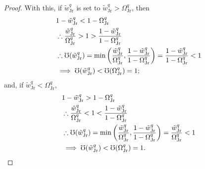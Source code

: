 \documentclass[hidelinks, nonatbib]{elsarticle}
\begin{document}
\begin{lemma}
\begin{proof}
        With this, if $\tilde{w}_{\text{Jr}}^{q}$ is set to $\tilde{w}_{\text{Jr}}^{q} > \Omega_{\text{Jr}}^{q}$, then
        \begin{align}
            &
            1 - \tilde{w}_{\text{Jr}}^{q}
            <
            1 - \Omega_{\text{Jr}}^{q}
            \\
            &\therefore
            \frac{
                \tilde{w}_{\text{Jr}}^{q}
            }{
                \Omega_{\text{Jr}}^{q}
            }
            >
            1
            >
            \frac{
                1 - \tilde{w}_{\text{Jr}}^{q}
            }{
                1 - \Omega_{\text{Jr}}^{q}
            }
            \\
            &\therefore
            \mho(\tilde{w}_{\text{Jr}}^{q}) 
            =
            \min\left(
                \frac{
                    \tilde{w}_{\text{Jr}}^{q}
                }{
                    \Omega_{\text{Jr}}^{q}
                }
                ,
                \frac{
                    1 - \tilde{w}_{\text{Jr}}^{q}
                }{
                    1 - \Omega_{\text{Jr}}^{q}
                }
            \right)
            =
            \frac{
                1 - \tilde{w}_{\text{Jr}}^{q}
            }{
                1 - \Omega_{\text{Jr}}^{q}
            }
            <
            1
            \\
            &\implies
            \mho(\tilde{w}_{\text{Jr}}^{q})
            <
            \mho(\Omega_{\text{Jr}}^{q})
            =
            1
            ;
        \end{align}
        and, if $\tilde{w}_{\text{Jr}}^{q} < \Omega_{\text{Jr}}^{q}$,
        \begin{align}
            &
            1 - \tilde{w}_{\text{Jr}}^{q}
            >
            1 - \Omega_{\text{Jr}}^{q}
            \\
            &\therefore
            \frac{
                \tilde{w}_{\text{Jr}}^{q}
            }{
                \Omega_{\text{Jr}}^{q}
            }
            <
            1
            <
            \frac{
                1 - \tilde{w}_{\text{Jr}}^{q}
            }{
                1 - \Omega_{\text{Jr}}^{q}
            }
            \\
            &\therefore
            \mho(\tilde{w}_{\text{Jr}}^{q}) 
            =
            \min\left(
                \frac{
                    \tilde{w}_{\text{Jr}}^{q}
                }{
                    \Omega_{\text{Jr}}^{q}
                }
                ,
                \frac{
                    1 - \tilde{w}_{\text{Jr}}^{q}
                }{
                    1 - \Omega_{\text{Jr}}^{q}
                }
            \right)
            =
            \frac{
                \tilde{w}_{\text{Jr}}^{q}
            }{
                \Omega_{\text{Jr}}^{q}
            }
            <
            1
            \\
            &\implies
            \mho(\tilde{w}_{\text{Jr}}^{q})
            <
            \mho(\Omega_{\text{Jr}}^{q})
            =
            1
            .
        \end{align}
        

\end{proof}
\end{lemma}
\end{document}
